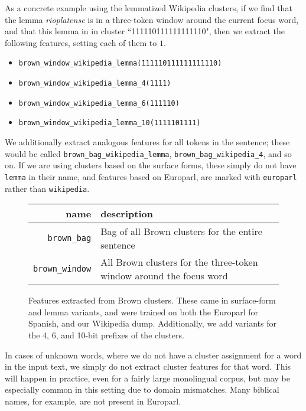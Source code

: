 As a concrete example using the lemmatized Wikipedia clusters, if we find that
the lemma \emph{rioplatense} is in a three-token window around the current
focus word, and that this lemma in in cluster ``111110111111111110", then we
extract the following features, setting each of them to $1$.

\begin{itemize}
\item \texttt{brown\_window\_wikipedia\_lemma(111110111111111110)}
\item \texttt{brown\_window\_wikipedia\_lemma\_4(1111)}
\item \texttt{brown\_window\_wikipedia\_lemma\_6(111110)}
\item \texttt{brown\_window\_wikipedia\_lemma\_10(1111101111)}
\end{itemize}

We additionally extract analogous features for all tokens in the sentence;
these would be called \texttt{brown\_bag\_wikipedia\_lemma},
\texttt{brown\_bag\_wikipedia\_4}, and so on. If we are using clusters based on
the surface forms, these simply do not have \texttt{lemma} in their name, and
features based on Europarl, are marked with \texttt{europarl} rather than
\texttt{wikipedia}.

\begin{figure*}
  \begin{centering}
  \begin{tabular}{|r|p{11cm}|}
    \hline
    name          & description  \\
    \hline
    \texttt{brown\_bag}    & Bag of all Brown clusters for the entire sentence \\
    \hline
    \texttt{brown\_window}  & All Brown clusters for the three-token window around the focus word \\
    \hline
  \end{tabular}
  \end{centering}
  \caption{Features extracted from Brown clusters. These came in surface-form
  and lemma variants, and were trained on both the Europarl for Spanish, and
  our Wikipedia dump. Additionally, we add variants for the 4, 6, and 10-bit
  prefixes of the clusters.}
  \label{fig:brownfeatures}
\end{figure*}

In cases of unknown words, where we do not have a cluster assignment for a word
in the input text, we simply do not extract cluster features for that word.
This will happen in practice, even for a fairly large monolingual corpus, but
may be especially common in this setting due to domain mismatches. Many
biblical names, for example, are not present in Europarl.

